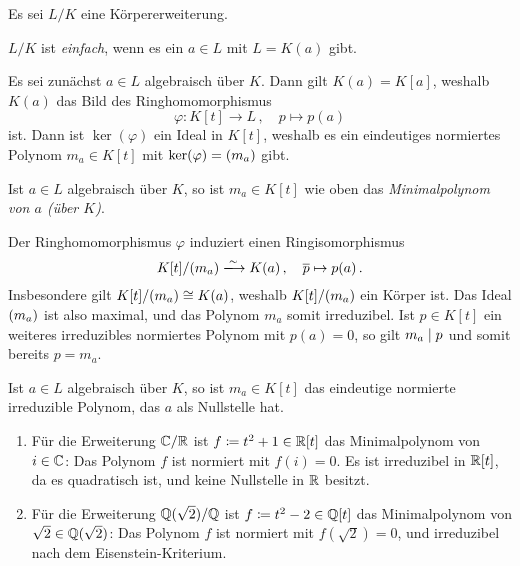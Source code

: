 Es sei $L/K$ eine Körpererweiterung.

\begin{definition}
  $L/K$ ist \emph{einfach}, wenn es ein $a \in L$ mit $L = K(a)$ gibt.
\end{definition}

Es sei zunächst $a \in L$ algebraisch über $K$.
Dann gilt $K(a) = K[a]$, weshalb $K(a)$ das Bild des Ringhomomorphismus
\[
          \varphi
  \colon  K[t]
  \to     L \,,
  \quad   p
  \mapsto p(a)
\]
ist.
Dann ist $\ker(\varphi)$ ein Ideal in $K[t]$, weshalb es ein eindeutiges normiertes Polynom $m_a \in K[t]$ mit $\ker(\varphi) = (m_a)$ gibt.

\begin{definition}
  Ist $a \in L$ algebraisch über $K$, so ist $m_a \in K[t]$ wie oben das \emph{Minimalpolynom von $a$ \textup(über $K$\textup)}.
\end{definition}

Der Ringhomomorphismus $\varphi$ induziert einen Ringisomorphismus
\[
                          K[t]/\genideal{m_a}
  \xlongrightarrow{\sim}  K(a) \,,
  \quad                   \class{p}
  \mapsto                 p(a) \,.
\]
Insbesondere gilt $K[t]/(m_a) \cong K(a)$, weshalb $K[t]/(m_a)$ ein Körper ist.
Das Ideal $(m_a)$ ist also maximal, und das Polynom $m_a$ somit irreduzibel.
Ist $p \in K[t]$ ein weiteres irreduzibles normiertes Polynom mit $p(a) = 0$, so gilt $m_a \mathrel{|} p$ und somit bereits $p = m_a$.

\begin{corollary}
  Ist $a \in L$ algebraisch über $K$, so ist $m_a \in K[t]$ das eindeutige normierte irreduzible Polynom, das $a$ als Nullstelle hat.
\end{corollary}

\begin{example}
  \label{example: minimal polynomials}
  \begin{enumerate}
    \item
      Für die Erweiterung $\mathbb{C}/\mathbb{R}$ ist $f \coloneqq t^2 + 1 \in \mathbb{R}[t]$ das Minimalpolynom von $i \in \mathbb{C}$:
      Das Polynom $f$ ist normiert mit $f(i) = 0$.
      Es ist irreduzibel in $\mathbb{R}[t]$, da es quadratisch ist, und keine Nullstelle in $\mathbb{R}$ besitzt.
    \item
      Für die Erweiterung $\mathbb{Q}(\sqrt{2})/\mathbb{Q}$ ist $f \coloneqq t^2 - 2 \in \mathbb{Q}[t]$ das Minimalpolynom von $\sqrt{2} \in \mathbb{Q}(\sqrt{2})$:
      Das Polynom $f$ ist normiert mit $f(\sqrt{2}) = 0$, und irreduzibel nach dem Eisenstein-Kriterium.
  \end{enumerate}
\end{example}

